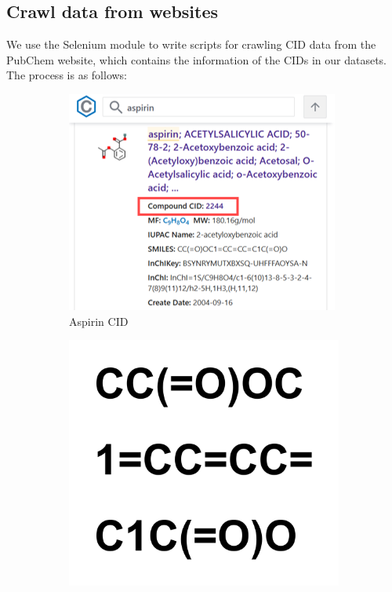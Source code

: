 \documentclass{mcmthesis}
\begin{document}
\subsection{Crawl data from websites}
We use the Selenium module to write scripts for crawling CID data from the PubChem website, which contains the information of the CIDs in our datasets. The process is as follows:
\begin{figure}[htbp]
    \centering
    \begin{subfigure}{0.3\textwidth}
        \includegraphics[width=\linewidth]{pics/aspirin_cid.png}
        \caption{Aspirin CID}
        \label{fig:Aspirin CID}
    \end{subfigure}
    \hfill
    \begin{subfigure}{0.3\textwidth}
        \includegraphics[width=\linewidth]{pics/aspirin_smiles.png}

\end{subfigure}
\end{figure}
\end{document}
